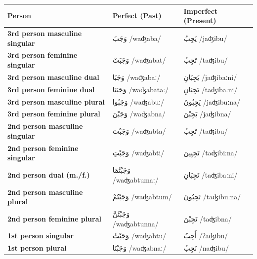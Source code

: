 \documentclass[letterpaper,12pt]{article}
\begin{document}
\begin{longtable}{|>{\raggedright}p{3.5cm}|p{5cm}|p{5cm}|}
\hline
\textbf{Person} & \textbf{Perfect (Past)} & \textbf{Imperfect (Present)} \\
\hline
\textbf{3rd person masculine singular} & \textarabic{وَجَبَ} /waʤaba/ & \textarabic{يَجِبُ} /jaʤibu/ \\
\hline
\textbf{3rd person feminine singular} & \textarabic{وَجَبَتْ} /waʤabat/ & \textarabic{تَجِبُ} /taʤibu/ \\
\hline
\textbf{3rd person masculine dual} & \textarabic{وَجَبَا} /waʤabaː/ & \textarabic{يَجِبَانِ} /jaʤibaːni/ \\
\hline
\textbf{3rd person feminine dual} & \textarabic{وَجَبَتَا} /waʤabataː/ & \textarabic{تَجِبَانِ} /taʤibaːni/ \\
\hline
\textbf{3rd person masculine plural} & \textarabic{وَجَبُوا} /waʤabuː/ & \textarabic{يَجِبُونَ} /jaʤibuːna/ \\
\hline
\textbf{3rd person feminine plural} & \textarabic{وَجَبْنَ} /waʤabna/ & \textarabic{يَجِبْنَ} /jaʤibna/ \\
\hline
\textbf{2nd person masculine singular} & \textarabic{وَجَبْتَ} /waʤabta/ & \textarabic{تَجِبُ} /taʤibu/ \\
\hline
\textbf{2nd person feminine singular} & \textarabic{وَجَبْتِ} /waʤabti/ & \textarabic{تَجِبِينَ} /taʤibiːna/ \\
\hline
\textbf{2nd person dual (m./f.)} & \textarabic{وَجَبْتُمَا} /waʤabtumaː/ & \textarabic{تَجِبَانِ} /taʤibaːni/ \\
\hline
\textbf{2nd person masculine plural} & \textarabic{وَجَبْتُمْ} /waʤabtum/ & \textarabic{تَجِبُونَ} /taʤibuːna/ \\
\hline
\textbf{2nd person feminine plural} & \textarabic{وَجَبْتُنَّ} /waʤabtunna/ & \textarabic{تَجِبْنَ} /taʤibna/ \\
\hline
\textbf{1st person singular} & \textarabic{وَجَبْتُ} /waʤabtu/ & \textarabic{أَجِبُ} /ʔaʤibu/ \\
\hline
\textbf{1st person plural} & \textarabic{وَجَبْنَا} /waʤabnaː/ & \textarabic{نَجِبُ} /naʤibu/ \\
\hline
\end{longtable}
\end{document}
